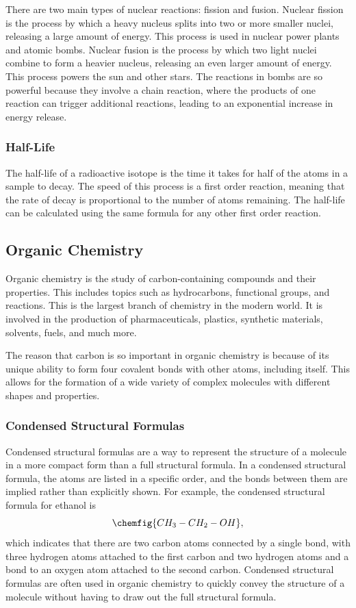 There are two main types of nuclear reactions: fission and fusion. Nuclear fission is the process by which a heavy nucleus splits into two or more smaller nuclei, releasing a large amount of energy. This process is used in nuclear power plants and atomic bombs. Nuclear fusion is the process by which two light nuclei combine to form a heavier nucleus, releasing an even larger amount of energy. This process powers the sun and other stars. The reactions in bombs are so powerful because they involve a chain reaction, where the products of one reaction can trigger additional reactions, leading to an exponential increase in energy release. 
\subsubsection{Half-Life}
The half-life of a radioactive isotope is the time it takes for half of the atoms in a sample to decay. The speed of this process is a first order reaction, meaning that the rate of decay is proportional to the number of atoms remaining. The half-life can be calculated using the same formula for any other first order reaction.
\subsection{Organic Chemistry}
Organic chemistry is the study of carbon-containing compounds and their properties. This includes topics such as hydrocarbons, functional groups, and reactions. This is the largest branch of chemistry in the modern world. It is involved in the production of pharmaceuticals, plastics, synthetic materials, solvents, fuels, and much more.

The reason that carbon is so important in organic chemistry is because of its unique ability to form four covalent bonds with other atoms, including itself. This allows for the formation of a wide variety of complex molecules with different shapes and properties. 
\subsubsection{Condensed Structural Formulas}
Condensed structural formulas are a way to represent the structure of a molecule in a more compact form than a full structural formula. In a condensed structural formula, the atoms are listed in a specific order, and the bonds between them are implied rather than explicitly shown. For example, the condensed structural formula for ethanol is 
\[\chemfig{CH_3 - CH_2 - OH},\]
which indicates that there are two carbon atoms connected by a single bond, with three hydrogen atoms attached to the first carbon and two hydrogen atoms and a bond to an oxygen atom attached to the second carbon. Condensed structural formulas are often used in organic chemistry to quickly convey the structure of a molecule without having to draw out the full structural formula.
